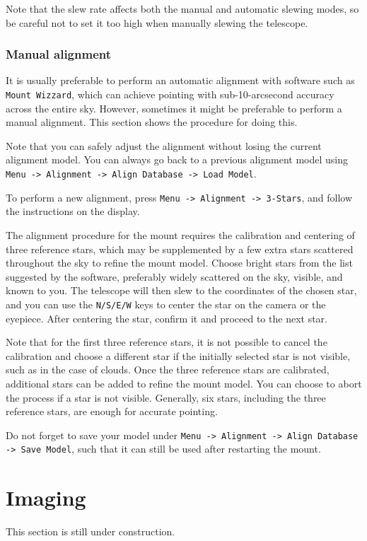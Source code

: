 \documentclass[a4paper, 11pt, fleqn]{memoir}
\begin{document}
Note that the slew rate affects both the manual and automatic slewing modes, so be careful not to set it too high when manually slewing the telescope.

\subsection{Manual alignment}

It is usually preferable to perform an automatic alignment with software such as \texttt{Mount Wizzard}, which can achieve pointing with sub-10-arcsecond accuracy across the entire sky.
However, sometimes it might be preferable to perform a manual alignment.
This section shows the procedure for doing this.

Note that you can safely adjust the alignment without losing the current alignment model.
You can always go back to a previous alignment model using \texttt{Menu -> Alignment -> Align Database -> Load Model}.

To perform a new alignment, press \texttt{Menu -> Alignment -> 3-Stars}, and follow the instructions on the display.

The alignment procedure for the mount requires the calibration and centering of three reference stars, which may be supplemented by a few extra stars scattered throughout the sky to refine the mount model.
Choose bright stars from the list suggested by the software, preferably widely scattered on the sky, visible, and known to you.
The telescope will then slew to the coordinates of the chosen star, and you can use the \texttt{N/S/E/W} keys to center the star on the camera or the eyepiece.
After centering the star, confirm it and proceed to the next star.

Note that for the first three reference stars, it is not possible to cancel the calibration and choose a different star if the initially selected star is not visible, such as in the case of clouds.
Once the three reference stars are calibrated, additional stars can be added to refine the mount model.
You can choose to abort the process if a star is not visible.
Generally, six stars, including the three reference stars, are enough for accurate pointing.

Do not forget to save your model under \texttt{Menu -> Alignment -> Align Database -> Save Model}, such that it can still be used after restarting the mount.

\chapter{Imaging}
This section is still under construction.
\end{document}
